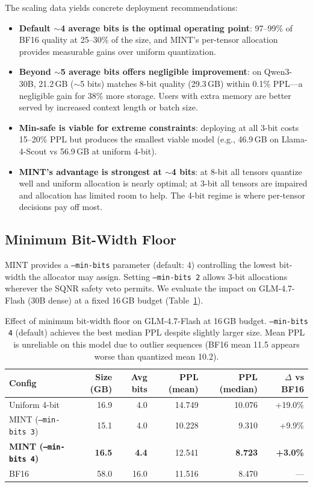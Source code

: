 \documentclass{article}
\begin{document}
The scaling data yields concrete deployment recommendations:
\begin{itemize}
    \item \textbf{Default ${\sim}$4 average bits is the optimal operating point}: 97--99\% of BF16 quality at 25--30\% of the size, and MINT's per-tensor allocation provides measurable gains over uniform quantization.
    \item \textbf{Beyond ${\sim}$5 average bits offers negligible improvement}: on Qwen3-30B, 21.2\,GB (${\sim}$5 bits) matches 8-bit quality (29.3\,GB) within 0.1\% PPL---a negligible gain for 38\% more storage. Users with extra memory are better served by increased context length or batch size.
    \item \textbf{Min-safe is viable for extreme constraints}: deploying at all 3-bit costs 15--20\% PPL but produces the smallest viable model (e.g., 46.9\,GB on Llama-4-Scout vs 56.9\,GB at uniform 4-bit).
    \item \textbf{MINT's advantage is strongest at ${\sim}$4 bits}: at 8-bit all tensors quantize well and uniform allocation is nearly optimal; at 3-bit all tensors are impaired and allocation has limited room to help. The 4-bit regime is where per-tensor decisions pay off most.
\end{itemize}

\subsection{Minimum Bit-Width Floor}
\label{sec:min_bits}

MINT provides a \texttt{--min-bits} parameter (default: 4) controlling the lowest bit-width the allocator may assign. Setting \texttt{--min-bits 2} allows 3-bit allocations wherever the SQNR safety veto permits. We evaluate the impact on GLM-4.7-Flash (30B dense) at a fixed 16\,GB budget (Table~\ref{tab:minbits}).

\begin{table}[h]
\centering
\caption{Effect of minimum bit-width floor on GLM-4.7-Flash at 16\,GB budget. \texttt{--min-bits 4} (default) achieves the best median PPL despite slightly larger size. Mean PPL is unreliable on this model due to outlier sequences (BF16 mean 11.5 appears worse than quantized mean 10.2).}
\label{tab:minbits}
\begin{tabular}{lrrrrr}
\toprule
Config & Size (GB) & Avg bits & PPL (mean) & PPL (median) & $\Delta$ vs BF16 \\
\midrule
Uniform 4-bit & 16.9 & 4.0 & 14.749 & 10.076 & +19.0\% \\
MINT (\texttt{--min-bits 3}) & 15.1 & 4.0 & 10.228 & 9.310 & +9.9\% \\
\textbf{MINT (\texttt{--min-bits 4})} & \textbf{16.5} & \textbf{4.4} & 12.541 & \textbf{8.723} & \textbf{+3.0\%} \\
BF16 & 58.0 & 16.0 & 11.516 & 8.470 & --- \\
\bottomrule
\end{tabular}
\end{table}
\end{document}

